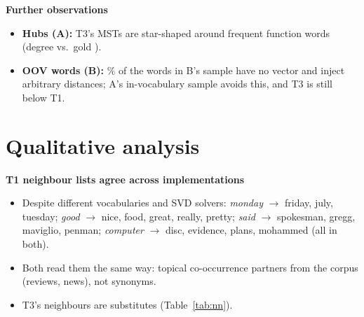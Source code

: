 \documentclass[11pt,a4paper]{article}
\newcommand{\blk}[1]{\par\needspace{5\baselineskip}\smallskip\noindent\textbf{#1}\par\nobreak\vspace{1pt}}
\begin{document}
\blk{Further observations}
\begin{itemize}
\item \textbf{Hubs (A):} T3's MSTs are star-shaped around frequent function words (degree \FnDegTThree{} vs.\ gold \FnDegGold).
\item \textbf{OOV words (B):} \BNoVecTwenty\% of the words in B's sample have no vector and inject arbitrary distances; A's in-vocabulary
sample avoids this, and T3 is still below T1.
\end{itemize}
\begin{table}[h]\centering\footnotesize\setlength{\tabcolsep}{4pt}
\caption{A's diagnostic ladder on the same sentences; edge AUC = probability that a gold edge pair is closer than a non-edge pair in the same sentence.}\label{tab:ladder}\end{table}
\begin{table}[h]\centering\footnotesize\setlength{\tabcolsep}{4pt}
\caption{A's diagnostics: neighbour types, hubness, edge AUC and MST shape.}\label{tab:diag}\end{table}

\section{Qualitative analysis}\label{sec:qual}
\blk{T1 neighbour lists agree across implementations}
\begin{itemize}
\item Despite different vocabularies and SVD solvers: \emph{monday} $\to$ friday, july, tuesday; \emph{good} $\to$ nice, food, great, really,
pretty; \emph{said} $\to$ spokesman, gregg, maviglio, penman; \emph{computer} $\to$ disc, evidence, plans, mohammed (all in both).
\item Both read them the same way: topical co-occurrence partners from the corpus (reviews, news), not synonyms.
\item T3's neighbours are substitutes (Table~\ref{tab:nn}).
\end{itemize}
\begin{table}[h]\centering\footnotesize\setlength{\tabcolsep}{4pt}
\caption{Nearest neighbours in A (B's T1 lists, given in the text, agree).}\label{tab:nn}\end{table}
\end{document}

